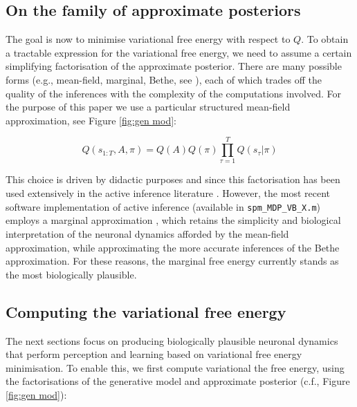 \documentclass[review,12pt,authoryear]{elsarticle}
\begin{document}
\begin{figure}
    \label{fig: VFE interpretations}
\end{figure}


\subsection{On the family of approximate posteriors}

The goal is now to minimise variational free energy with respect to $Q$. To obtain a tractable expression for the variational free energy, we need to assume a certain simplifying factorisation of the approximate posterior. There are many possible forms (e.g., mean-field, marginal, Bethe, see \citep{parrNeuronalMessagePassing2019,yedidiaConstructingFreeEnergyApproximations2005,heskesConvexityArgumentsEfficient2006}), each of which trades off the quality of the inferences with the complexity of the computations involved. For the purpose of this paper we use a particular structured mean-field approximation, see Figure \ref{fig:gen mod}:
  		
  		\begin{equation}
  		\label{eq: mean field approx}
  		    Q(s_{1:T},A,\pi) = Q(A)Q(\pi) \prod_{\tau =1}^T Q(s_\tau|\pi)
  		\end{equation}
  		
This choice is driven by didactic purposes and since this factorisation has been used extensively in the active inference literature \citep{fristonDeepTemporalModels2018,fristonGraphicalBrainBelief2017,fristonActiveInferenceProcess2017}. However, the most recent software implementation of active inference (available in \texttt{spm\_MDP\_VB\_X.m}) employs a marginal approximation \citep{parrNeuronalMessagePassing2019,parrComputationalNeurologyActive2019}, which retains the simplicity and biological interpretation of the neuronal dynamics afforded by the mean-field approximation, while approximating the more accurate inferences of the Bethe approximation. For these reasons, the marginal free energy currently stands as the most biologically plausible.

\subsection{Computing the variational free energy}

The next sections focus on producing biologically plausible neuronal dynamics that perform perception and learning based on variational free energy minimisation. To enable this, we first compute variational the free energy, using the factorisations of the generative model and approximate posterior (c.f., Figure \ref{fig:gen mod}):
\end{document}
